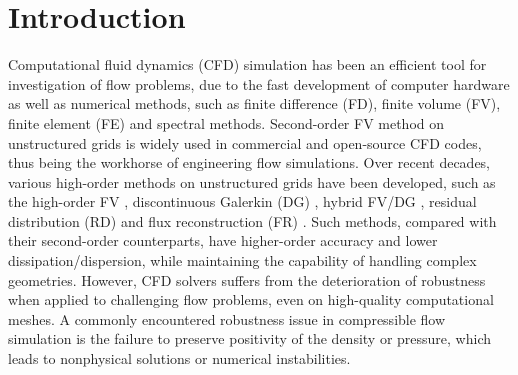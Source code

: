 

\section{Introduction}
\label{sec:intro}

Computational fluid dynamics (CFD) simulation
has been an efficient tool for investigation of flow problems,
due to the fast development of computer hardware as well as numerical methods,
such as finite difference (FD), finite volume (FV), finite element (FE) and spectral methods.
Second-order FV method on unstructured grids \cite{van1979towards}
is widely used in commercial and open-source CFD codes, thus being the workhorse of engineering
flow simulations. Over recent decades, various high-order methods on unstructured grids have been developed,
such as the high-order FV \cite{ollivier1997quasi_ENO,dumbser2007quadrature_WENO,wang2017compact_VR},
discontinuous Galerkin (DG) \cite{reed1973triangularDG,cockburn2001rungeDG},
hybrid FV/DG \cite{dumbser2008unified,li2022reconstructed,zhang2012class1},
residual distribution (RD)  \cite{abgrall2003construction} and
flux reconstruction (FR) \cite{huynh2007flux,vincent2011new,wang2009unifying}.
Such methods, compared with their second-order counterparts,
have higher-order accuracy and lower dissipation/dispersion,
while maintaining the capability of handling complex geometries.
However, CFD solvers suffers from the deterioration of robustness when applied
to challenging flow problems, even on high-quality computational meshes.
A commonly encountered robustness issue in compressible flow simulation is the failure to
preserve positivity of the density or pressure, which leads to nonphysical solutions or numerical instabilities.

